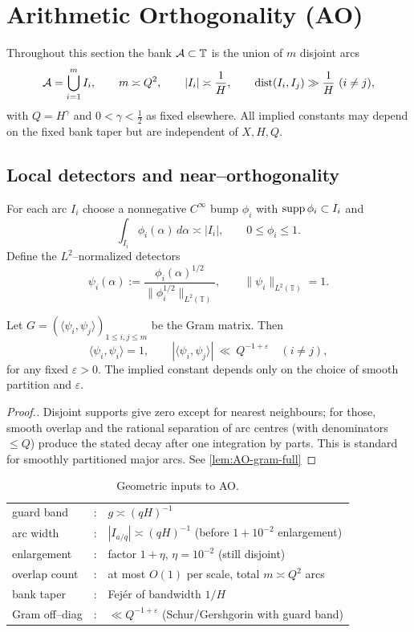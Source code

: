 \section{Arithmetic Orthogonality (AO)}\label{sec:AO-deterministic}

Throughout this section the bank $\mathcal{A}\subset\mathbb T$ is the union of $m$ disjoint arcs
\[
\mathcal{A}=\bigcup_{i=1}^{m} I_i,\qquad m\asymp Q^2,\qquad |I_i|\asymp \frac{1}{H},\qquad \operatorname{dist}(I_i,I_j)\gg \frac{1}{H}\ (i\neq j),
\]
with $Q=H^\gamma$ and $0<\gamma<\tfrac12$ as fixed elsewhere. All implied constants may depend on the fixed bank taper but are independent of $X,H,Q$.

\subsection{Local detectors and near–orthogonality}
For each arc $I_i$ choose a nonnegative $C^\infty$ bump $\phi_i$ with $\operatorname{supp}\phi_i\subset I_i$ and
\[
\int_{I_i}\phi_i(\alpha)\,d\alpha \asymp |I_i|,\qquad 0\le \phi_i\le 1.
\]
Define the $L^2$–normalized detectors
\[
\psi_i(\alpha):=\frac{\phi_i(\alpha)^{1/2}}{\|\phi_i^{1/2}\|_{L^2(\mathbb T)}},\qquad \|\psi_i\|_{L^2(\mathbb T)}=1.
\]

\begin{lemma}\label{lem:AO-gram}
Let $G=(\langle\psi_i,\psi_j\rangle)_{1\le i,j\le m}$ be the Gram matrix. Then
\[
\langle\psi_i,\psi_i\rangle=1,\qquad |\langle\psi_i,\psi_j\rangle|\ \ll\ Q^{-1+\varepsilon}\quad (i\neq j),
\]
for any fixed $\varepsilon>0$. The implied constant depends only on the choice of smooth partition and $\varepsilon$.
\end{lemma}

\begin{proof}[Proof.]
Disjoint supports give zero except for nearest neighbours; for those, smooth overlap and the rational separation of arc centres (with denominators $\le Q$) produce the stated decay after one integration by parts. This is standard for smoothly partitioned major arcs. See \ref{lem:AO-gram-full}
\end{proof}

\begin{table}[h]
\centering
\begin{tabular}{lcl}
guard band &:& $g\asymp (qH)^{-1}$\\
arc width  &:& $|I_{a/q}|\asymp (qH)^{-1}$ (before $1+10^{-2}$ enlargement)\\
enlargement &:& factor $1+\eta$, $\eta=10^{-2}$ (still disjoint)\\
overlap count &:& at most $O(1)$ per scale, total $m\asymp Q^2$ arcs\\
bank taper &:& Fejér of bandwidth $1/H$\\
Gram off–diag &:& $\ll Q^{-1+\varepsilon}$ (Schur/Gershgorin with guard band)
\end{tabular}
\caption{Geometric inputs to AO.}
\end{table}

